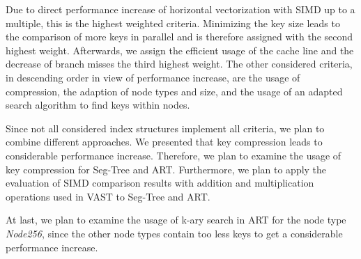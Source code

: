 \documentclass[conference]{IEEEtran}
\begin{document}
Due to direct performance increase of horizontal vectorization with SIMD up to a multiple, this is the highest weighted criteria. Minimizing the key size leads to the comparison of more keys in parallel and is therefore assigned with the second highest weight. Afterwards, we assign the efficient usage of the cache line and the decrease of branch misses the third highest weight. The other considered criteria, in descending order in view of performance increase, are the usage of compression, the adaption of node types and size, and the usage of an adapted search algorithm to find keys within nodes. 

Since not all considered index structures implement all criteria, we plan to combine different approaches. We presented that key compression leads to considerable performance increase. Therefore, we plan to examine the usage of key compression for Seg-Tree and ART. Furthermore, we plan to apply the evaluation of SIMD comparison results with addition and multiplication operations used in VAST to Seg-Tree and ART. 

At last, we plan to examine the usage of k-ary search in ART for the node type \emph{Node256}, since the other node types contain too less keys to get a considerable performance increase. 

\end{document}
